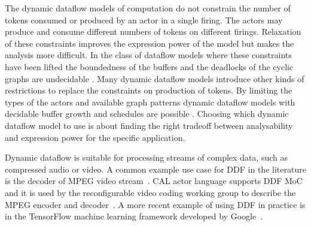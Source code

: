 The dynamic dataflow models of computation do not constrain the number of tokens consumed or produced by an actor in a single firing. The actors may produce and consume different numbers of tokens on different firings. Relaxation of these constraints improves the expression power of the model but makes the analysis more difficult. In the class of dataflow models where these constraints have been lifted the boundedness of the buffers and the deadlocks of the cyclic graphs are undecidable \cite{buck1993scheduling}. Many dynamic dataflow models introduce other kinds of restrictions to replace the constraints on production of tokens. By limiting the types of the actors and available graph patterns dynamic dataflow models with decidable buffer growth and schedules are possible \cite{bhattacharyya2013handbook, gao1992well}. Choosing which dynamic dataflow model to use is about finding the right tradeoff between analysability and expression power for the specific application.

Dynamic dataflow is suitable for processing streams of complex data, such as compressed audio or video. A common example use case for DDF in the literature is the decoder of MPEG video stream~\cite{bhattacharyya2013handbook}. CAL actor language supports DDF MoC and it is used by the reconfigurable video coding working group to describe the MPEG encoder and decoder~\cite{bhattacharyya2011overview}. A more recent example of using DDF in practice is in the TensorFlow machine learning framework developed by Google~\cite{tensorflow2015-whitepaper}.
